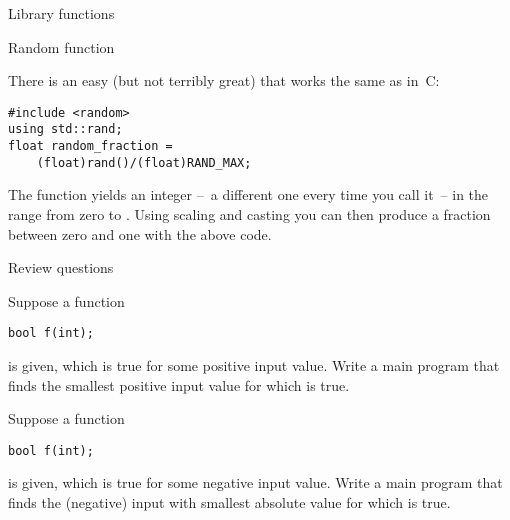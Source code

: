  {Library functions}

 {Random function}
\label{sed:crand}

There is an easy (but not terribly great)  that
works the same as in~C:

\begin{verbatim}
#include <random>
using std::rand;
float random_fraction =
    (float)rand()/(float)RAND_MAX;
\end{verbatim}
The function  yields an integer --~a different one
every time you call it~-- in the range from zero to
.
Using scaling and casting you can then produce a fraction between zero
and one with the above code.

 {Review questions}

\begin{exercise}
  \label{ex:cpp-funcloop1}
  Suppose a function
\begin{verbatim}
bool f(int);
\end{verbatim}
is given, which is true for some positive input value. Write a main program that
finds the smallest positive input value for which  is true.
\end{exercise}

\begin{exercise}
  \label{ex:cpp-funcloop2}
  Suppose a function
\begin{verbatim}
bool f(int);
\end{verbatim}
is given, which is true for some negative input value. Write a main program that
finds the (negative) input with smallest absolute value for which  is true.
\end{exercise}
